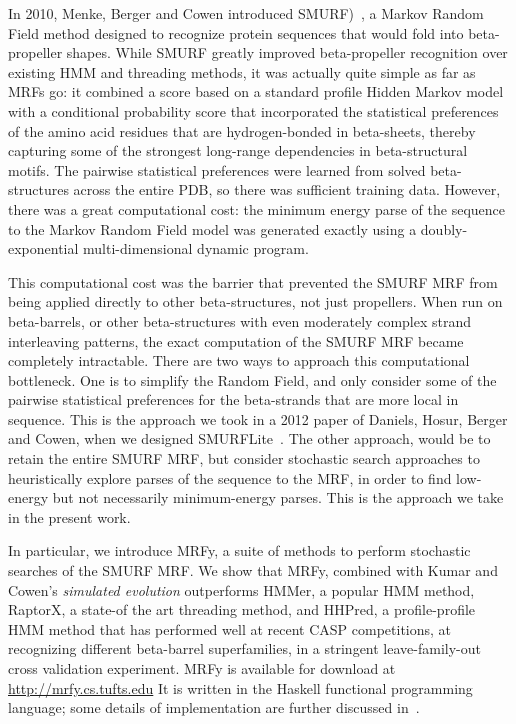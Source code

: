 \documentclass{acm_proc_article-sp}
\begin{document}
In 2010, Menke, Berger and Cowen introduced
SMURF)~\cite{Menke:2010ti}, a Markov Random Field method designed to
recognize protein sequences that would fold into beta-propeller
shapes. While SMURF greatly improved beta-propeller recognition over
existing HMM and threading methods, it was actually quite simple as
far as MRFs go: it combined a score based on a standard profile Hidden
Markov model with a conditional probability score that incorporated
the statistical preferences of the amino acid residues that are
hydrogen-bonded in beta-sheets, thereby capturing some of the
strongest long-range dependencies in beta-structural motifs.  The
pairwise statistical preferences were learned from solved
beta-structures across the entire PDB, so there was sufficient
training data. However, there was a great computational cost: the
minimum energy parse of the sequence to the Markov Random Field model
was generated exactly using a doubly-exponential multi-dimensional
dynamic program.


This computational cost was the barrier that prevented the SMURF MRF
from being applied directly to other beta-structures, not just
propellers.  When run on beta-barrels, or other beta-structures with
even moderately complex strand interleaving patterns, the exact
computation of the SMURF MRF became completely intractable. There are
two ways to approach this computational bottleneck. One is to simplify
the Random Field, and only consider some of the pairwise statistical
preferences for the beta-strands that are more local in sequence.
This is the approach we took in a 2012 paper of Daniels, Hosur, Berger
and Cowen, when we designed SMURFLite~\cite{Daniels:2012dg}. The other
approach, would be to retain the entire SMURF MRF, but consider
stochastic search approaches to heuristically explore parses of the
sequence to the MRF, in order to find low-energy but not necessarily
minimum-energy parses. This is the approach we take in the present
work.

In particular, we introduce MRFy, a suite of methods to perform
stochastic searches of the SMURF MRF. We show that MRFy, combined with
Kumar and Cowen's {\em simulated evolution\/} outperforms HMMer, a
popular HMM method, RaptorX, a state-of the art threading method, and
HHPred, a profile-profile HMM method that has performed well at recent
CASP competitions, at recognizing different beta-barrel superfamilies,
in a stringent leave-family-out cross validation experiment. MRFy is
available for download at \url{http://mrfy.cs.tufts.edu}  It is written in the Haskell functional
programming language; some details of implementation are further discussed 
in~\cite{Daniels:2012cm}.
\end{document}
